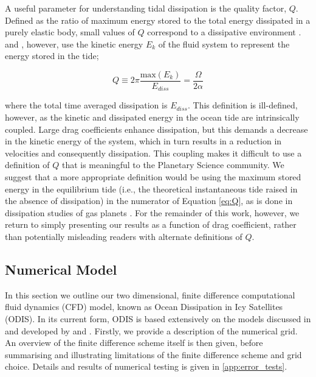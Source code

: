 A useful parameter for understanding tidal dissipation is the quality factor, $Q$. Defined as the ratio of maximum energy stored to the total energy dissipated in a purely elastic body, small values of $Q$ correspond to a dissipative environment \citep{goldreich1966q}. \citet{tyler2011tidal} and \citet{matsuyama2014tidal}, however, use the kinetic energy $E_k$ of the fluid system to represent the energy stored in the tide;

\begin{equation}\label{eq:Q}
Q \equiv 2 \pi \dfrac{\text{max} \left( E_{k} \right)}{E_{diss}} = \dfrac{\Omega}{2 \alpha}
\end{equation}

where the total time averaged dissipation is $E_{diss}$. This definition is ill-defined, however, as the kinetic and dissipated energy in the ocean tide are intrinsically coupled. Large drag coefficients enhance dissipation, but this demands a decrease in the kinetic energy of the system, which in turn results in a reduction in velocities and consequently dissipation. This coupling makes it difficult to use a definition of $Q$ that is meaningful to the Planetary Science community. We suggest that a more appropriate definition would be using the maximum stored energy in the equilibrium tide (i.e., the theoretical instantaneous tide raised in the absence of dissipation) in the numerator of Equation \ref{eq:Q}, as is done in dissipation studies of gas planets \citep{goldreich1966q}. For the remainder of this work, however, we return to simply presenting our results as a function of drag coefficient, rather than potentially misleading readers with alternate definitions of $Q$. 

\subsection{Numerical Model \label{subsec:model}}

In this section we outline our two dimensional, finite difference computational fluid dynamics (CFD) model, known as Ocean Dissipation in Icy Satellites (ODIS). In its current form, ODIS is based extensively on the models discussed in and developed by \citet{zahel1973diurnalk,zahel1978influence} and \citet{sears1994tidal,sears1995tidal}.
Firstly, we provide a description of the numerical grid. An overview of the finite difference scheme itself is then given, before summarising and illustrating limitations of the finite difference scheme and grid choice. Details and results of numerical testing is given in \ref{app:error_tests}.  

